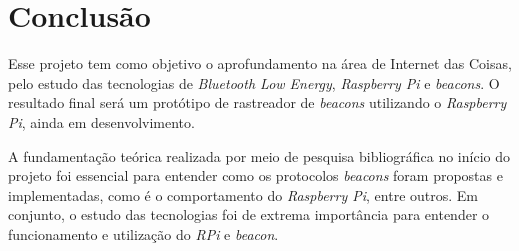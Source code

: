 \documentclass[
	12pt,				%
	openright,			%
	oneside,			%
	a4paper,			%
	chapter=TITLE,		%
	english,			%
	brazil				%
	]{abntex2}
\begin{document}
{%



\chapter{Conclusão}

Esse projeto tem como objetivo o aprofundamento na área de Internet das Coisas, pelo estudo das tecnologias de \textit{Bluetooth Low Energy}, \textit{Raspberry Pi} e \textit{beacons}. O resultado final será um protótipo de rastreador de \textit{beacons} utilizando o \textit{Raspberry Pi}, ainda em desenvolvimento.

A fundamentação teórica realizada por meio de pesquisa bibliográfica no início do projeto foi essencial para entender como os protocolos \textit{beacons} foram propostas e implementadas, como é o comportamento do \textit{Raspberry Pi}, entre outros. Em conjunto, o estudo das tecnologias foi de extrema importância para entender o funcionamento e utilização do \textit{RPi} e \textit{beacon}.

}
\end{document}
